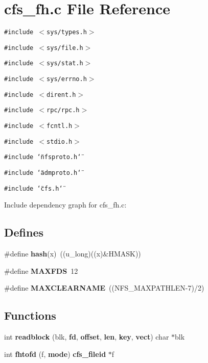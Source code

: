 \section{cfs\_\-fh.c File Reference}
\label{cfs__fh_8c}


{\tt \#include $<$sys/types.h$>$}\par
{\tt \#include $<$sys/file.h$>$}\par
{\tt \#include $<$sys/stat.h$>$}\par
{\tt \#include $<$sys/errno.h$>$}\par
{\tt \#include $<$dirent.h$>$}\par
{\tt \#include $<$rpc/rpc.h$>$}\par
{\tt \#include $<$fcntl.h$>$}\par
{\tt \#include $<$stdio.h$>$}\par
{\tt \#include \char`\"{}nfsproto.h\char`\"{}}\par
{\tt \#include \char`\"{}admproto.h\char`\"{}}\par
{\tt \#include \char`\"{}cfs.h\char`\"{}}\par


Include dependency graph for cfs\_\-fh.c:\subsection*{Defines}
\begin{CompactItemize}
\item 
\#define {\bf hash}(x)\ ((u\_\-long)((x)\&HMASK))
\item 
\#define {\bf MAXFDS}\ 12
\item 
\#define {\bf MAXCLEARNAME}\ ((NFS\_\-MAXPATHLEN-7)/2)
\end{CompactItemize}
\subsection*{Functions}
\begin{CompactItemize}
\item 
int {\bf readblock} (blk, {\bf fd}, {\bf offset}, {\bf len}, {\bf key}, {\bf vect}) char $\ast$blk
\item 
int {\bf fhtofd} (f, {\bf mode}) {\bf cfs\_\-fileid} $\ast$f
\end{CompactItemize}

